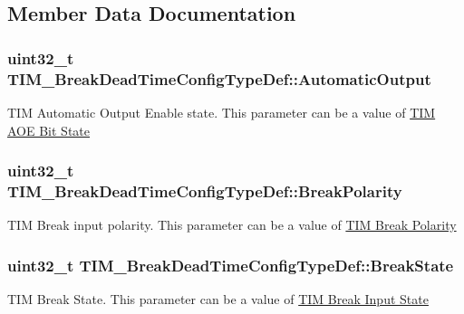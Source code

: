 \subsection{Member Data Documentation}
\subsubsection[{\texorpdfstring{Automatic\+Output}{AutomaticOutput}}]{\setlength{\rightskip}{0pt plus 5cm}uint32\+\_\+t T\+I\+M\+\_\+\+Break\+Dead\+Time\+Config\+Type\+Def\+::\+Automatic\+Output}\hypertarget{struct_t_i_m___break_dead_time_config_type_def_ae591f2368d0be5b77d8a746e73eabe71}{}\label{struct_t_i_m___break_dead_time_config_type_def_ae591f2368d0be5b77d8a746e73eabe71}
T\+IM Automatic Output Enable state. This parameter can be a value of \hyperlink{group___t_i_m___a_o_e___bit___set___reset}{T\+IM A\+OE Bit State} 
\subsubsection[{\texorpdfstring{Break\+Polarity}{BreakPolarity}}]{\setlength{\rightskip}{0pt plus 5cm}uint32\+\_\+t T\+I\+M\+\_\+\+Break\+Dead\+Time\+Config\+Type\+Def\+::\+Break\+Polarity}\hypertarget{struct_t_i_m___break_dead_time_config_type_def_ae15ddbf3087f9a2129a52a1317339ea7}{}\label{struct_t_i_m___break_dead_time_config_type_def_ae15ddbf3087f9a2129a52a1317339ea7}
T\+IM Break input polarity. This parameter can be a value of \hyperlink{group___t_i_m___break___polarity}{T\+IM Break Polarity} 
\subsubsection[{\texorpdfstring{Break\+State}{BreakState}}]{\setlength{\rightskip}{0pt plus 5cm}uint32\+\_\+t T\+I\+M\+\_\+\+Break\+Dead\+Time\+Config\+Type\+Def\+::\+Break\+State}\hypertarget{struct_t_i_m___break_dead_time_config_type_def_a8962430194b43ac28a14c96dd9cc44e6}{}\label{struct_t_i_m___break_dead_time_config_type_def_a8962430194b43ac28a14c96dd9cc44e6}
T\+IM Break State. This parameter can be a value of \hyperlink{group___t_i_m___break___input__enable__disable}{T\+IM Break Input State} 
